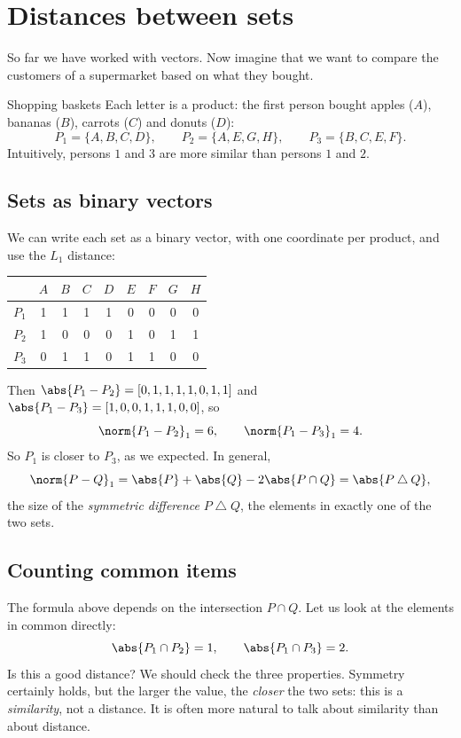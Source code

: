 \documentclass[a4paper,12pt,oneside]{report}
\begin{document}
\section{Distances between sets}

So far we have worked with vectors. Now imagine that we want to
compare the customers of a supermarket based on what they bought.

\begin{framedexample}{Shopping baskets}\label{ex:baskets}
Each letter is a product: the first person bought apples ($A$),
bananas ($B$), carrots ($C$) and donuts ($D$):
\[
  P_1=\{A,B,C,D\},\qquad
  P_2=\{A,E,G,H\},\qquad
  P_3=\{B,C,E,F\}.
\]
Intuitively, persons $1$ and $3$ are more similar than persons $1$
and $2$.
\end{framedexample}

\subsection{Sets as binary vectors}

We can write each set as a binary vector, with one coordinate per
product, and use the $L_1$ distance:
\begin{center}
\begin{tabular}{c|cccccccc}
      & $A$ & $B$ & $C$ & $D$ & $E$ & $F$ & $G$ & $H$\\
  \hline
  $P_1$ & 1 & 1 & 1 & 1 & 0 & 0 & 0 & 0\\
  $P_2$ & 1 & 0 & 0 & 0 & 1 & 0 & 1 & 1\\
  $P_3$ & 0 & 1 & 1 & 0 & 1 & 1 & 0 & 0
\end{tabular}
\end{center}
Then $\abs{P_1-P_2}=[0,1,1,1,1,0,1,1]$ and
$\abs{P_1-P_3}=[1,0,0,1,1,1,0,0]$, so
\[
  \norm{P_1-P_2}_1=6,\qquad\norm{P_1-P_3}_1=4.
\]
So $P_1$ is closer to $P_3$, as we expected. In general,
\[
  \norm{P-Q}_1=\abs{P}+\abs{Q}-2\abs{P\cap Q}=\abs{P\mathbin{\triangle}Q},
\]
the size of the \emph{symmetric difference} $P\mathbin{\triangle}Q$,
the elements in exactly one of the two sets.

\subsection{Counting common items}

The formula above depends on the intersection $P\cap Q$. Let us look
at the elements in common directly:
\[
  \abs{P_1\cap P_2}=1,\qquad\abs{P_1\cap P_3}=2.
\]
Is this a good distance? We should check the three properties.
Symmetry certainly holds, but the larger the value, the \emph{closer}
the two sets: this is a \emph{similarity}, not a distance. It is often
more natural to talk about similarity than about distance.
\end{document}
